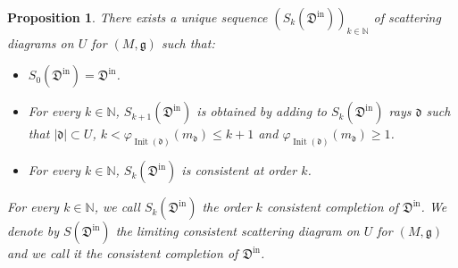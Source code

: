 \documentclass[12pt, a4paper]{amsart}
\newtheorem{prop}[defn]{Proposition}
\newcommand\NN{\mathbb N}
\newcommand\fd{\mathfrak d}
\newcommand\fD{\mathfrak D}
\newcommand\fg{\mathfrak g}
\newcommand\Init{\operatorname{Init}}
\newcommand\iin{\mathrm{in}}
\begin{document}
\begin{prop} \label{prop_consistent_completion}
There exists a unique sequence 
$(S_k(\fD^\iin))_{k \in \NN}$ of scattering
diagrams on $U$ for 
$(M,\fg)$ such that:
\begin{itemize}
\item[(i)] $S_0(\fD^\iin)=\fD^\iin$.
\item[(ii)] For every $k \in \NN$, 
$S_{k+1}(\fD^\iin)$ is obtained by adding to 
$S_k(\fD^\iin)$ rays $\fd$ such that
$|\fd|\subset U$,  $k < \varphi_{\Init(\fd)}(m_\fd) \leqslant k+1$ and $\varphi_{\Init(\fd)}(m_\fd) \geqslant 1$.
\item[(iii)] For every $k \in \NN$,
$S_k(\fD^\iin)$ is consistent at order $k$.
\end{itemize}
For every $k \in \NN$, we call $S_k(\fD^\iin)$ the order $k$ \emph{consistent completion} of $\fD^\iin$. We denote by $S(\fD^\iin)$ the limiting consistent scattering diagram on $U$ for 
$(M,\fg)$ and we call it the \emph{consistent completion} of 
$\fD^\iin$.
\end{prop}
\end{document}

